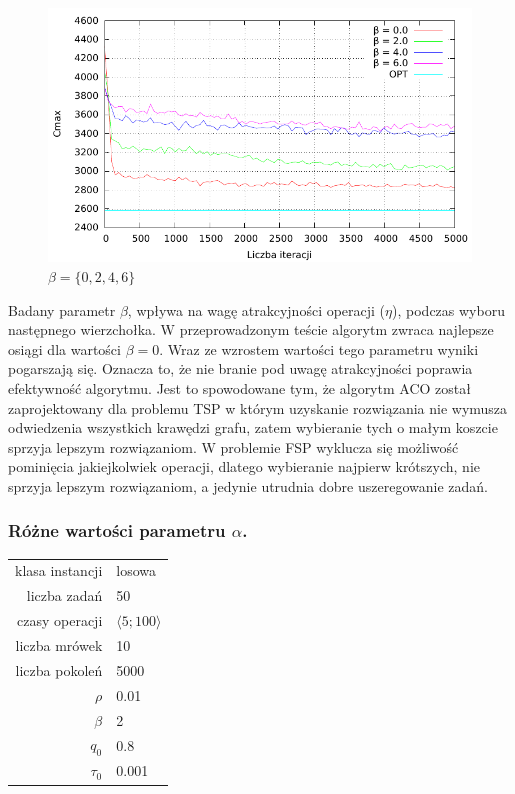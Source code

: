 \documentclass[10pt,a4paper]{article}
\begin{document}
\begin{figure}[h]
    \centering
    \includegraphics{./figures/inst01_rnd_beta_smooth.pdf}
    \caption{$ \beta = \{ 0, 2, 4, 6 \} $}
\end{figure}
\vspace{15mm}
Badany parametr $\beta$, wpływa na wagę atrakcyjności operacji ($\eta$), podczas wyboru następnego wierzchołka.
W przeprowadzonym teście algorytm zwraca najlepsze osiągi dla wartości $\beta = 0$.
Wraz ze wzrostem wartości tego parametru wyniki pogarszają się.
Oznacza to, że nie branie pod uwagę atrakcyjności poprawia efektywność algorytmu.
Jest to spowodowane tym, że algorytm ACO został zaprojektowany dla problemu TSP w którym uzyskanie rozwiązania nie wymusza odwiedzenia wszystkich krawędzi grafu, zatem wybieranie tych o małym koszcie sprzyja lepszym rozwiązaniom.
W problemie FSP wyklucza się możliwość pominięcia jakiejkolwiek operacji, dlatego wybieranie najpierw krótszych, nie sprzyja lepszym rozwiązaniom, a jedynie utrudnia dobre uszeregowanie zadań.

\newpage
\subsubsection{Różne wartości parametru $\alpha$.}
\vspace{6 mm}
\begin{center}
\begin{tabular}{|r|l|}
  \hline
  klasa instancji & losowa \\
  liczba zadań & 50 \\
  czasy operacji & $ \langle 5;100 \rangle $  \\
  liczba mrówek & 10 \\
  liczba pokoleń & 5000 \\
  $ \rho $ & 0.01 \\
  $ \beta $ & 2 \\
  $ q_0 $ & 0.8 \\
  $ \tau_0 $ & 0.001 \\
  \hline
\end{tabular}
\end{center}
\end{document}
